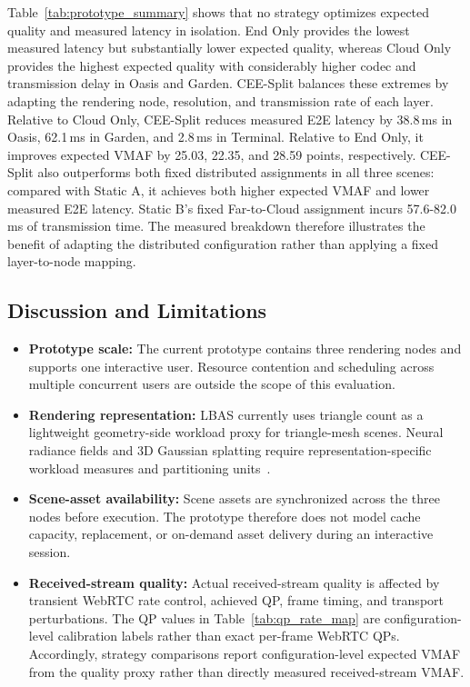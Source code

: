 \documentclass[acmsmall]{acmart}
\begin{document}
	Table~\ref{tab:prototype_summary} shows that no strategy optimizes expected quality and measured latency in isolation. End Only provides the lowest measured latency but substantially lower expected quality, whereas Cloud Only provides the highest expected quality with considerably higher codec and transmission delay in Oasis and Garden. CEE-Split balances these extremes by adapting the rendering node, resolution, and transmission rate of each layer. Relative to Cloud Only, CEE-Split reduces measured E2E latency by 38.8\,ms in Oasis, 62.1\,ms in Garden, and 2.8\,ms in Terminal. Relative to End Only, it improves expected VMAF by 25.03, 22.35, and 28.59 points, respectively. CEE-Split also outperforms both fixed distributed assignments in all three scenes: compared with Static A, it achieves both higher expected VMAF and lower measured E2E latency. Static B's fixed Far-to-Cloud assignment incurs 57.6-82.0\,ms of transmission time. The measured breakdown therefore illustrates the benefit of adapting the distributed configuration rather than applying a fixed layer-to-node mapping.
	
	\FloatBarrier
	\subsection{Discussion and Limitations}
	
	\begin{itemize}
		\item \textbf{Prototype scale:} The current prototype contains three rendering nodes and supports one interactive user. Resource contention and scheduling across multiple concurrent users are outside the scope of this evaluation.
		
		\item \textbf{Rendering representation:} LBAS currently uses triangle count as a lightweight geometry-side workload proxy for triangle-mesh scenes. Neural radiance fields and 3D Gaussian splatting require representation-specific workload measures and partitioning units~\cite{wu_embracing_2024,zhu_nebula_2025}.

		\item \textbf{Scene-asset availability:} Scene assets are synchronized across the three nodes before execution. The prototype therefore does not model cache capacity, replacement, or on-demand asset delivery during an interactive session.

		\item \textbf{Received-stream quality:} Actual received-stream quality is affected by transient WebRTC rate control, achieved QP, frame timing, and transport perturbations. The QP values in Table~\ref{tab:qp_rate_map} are configuration-level calibration labels rather than exact per-frame WebRTC QPs. Accordingly, strategy comparisons report configuration-level expected VMAF from the quality proxy rather than directly measured received-stream VMAF.
	\end{itemize}
	
\end{document}
